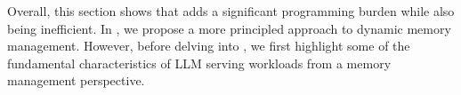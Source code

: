  
Overall, this section shows that \pa adds a significant programming burden while also being inefficient. In \sysname, we propose a more principled approach to  dynamic \kvcache memory management. However, before delving into \sysname, we first highlight some of the fundamental characteristics of LLM serving workloads from a memory management perspective.








